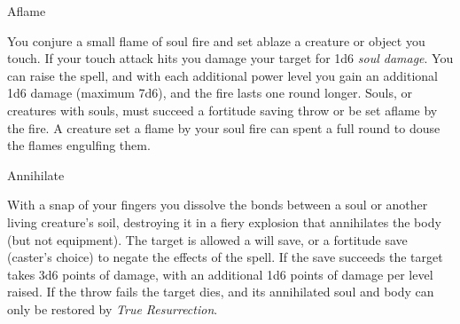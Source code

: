 \begin{soulpower}{Aflame}

  You conjure a small flame of soul fire and set ablaze a creature or object
  you touch. If your touch attack hits you damage your target for 1d6
  \emph{soul damage}. You can raise the spell, and with each additional power
  level you gain an additional 1d6 damage (maximum 7d6), and the fire lasts
  one round longer. Souls, or creatures with souls, must succeed a fortitude
  saving throw or be set aflame by the fire. A creature set a flame by your
  soul fire can spent a full round to douse the flames engulfing them.
\end{soulpower}

\begin{soulpower}{Annihilate}

  With a snap of your fingers you dissolve the bonds between a soul or another
  living creature's soil, destroying it in a fiery explosion that annihilates
  the body (but not equipment). The target is allowed a will save, or a
  fortitude save (caster's choice) to negate the effects of the spell. If the
  save succeeds the target takes 3d6 points of damage, with an additional 1d6
  points of damage per level raised. If the throw fails the target dies, and
  its annihilated soul and body can only be restored by \emph{True
    Resurrection}.
\end{soulpower}

